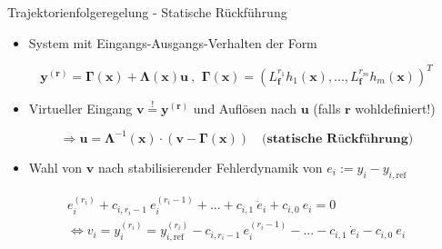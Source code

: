 \documentclass[
	ngerman,
	10pt,				%
	aspectratio=169, 	%
	xcolor=dvipsnames
]{beamer}
\begin{document}

\begin{frame}[t,fragile,label=trajektorienregelung_3]{\large Trajektorienfolgeregelung - Statische Rückführung}
	
	\begin{itemize}
		\item System mit Eingangs-Ausgangs-Verhalten der Form
	\end{itemize}
	\begin{equation*}
	\mathbf{y}^{(\mathbf{r})} = \boldsymbol{\Gamma}(\mathbf{x}) + \boldsymbol{\Lambda}(\mathbf{x}) \mathbf{u} \ \text{, } \ \boldsymbol{\Gamma}(\mathbf{x}) = (L_{\mathbf{f}}^{r_1} h_1(\mathbf{x}), ..., L_{\mathbf{f}}^{r_m} h_m(\mathbf{x}))^T
	\end{equation*}
	\pause
	\begin{itemize}
		\item Virtueller Eingang $\mathbf{v} \stackrel{!}{=} \mathbf{y}^{(\mathbf{r})}$ und Auflösen nach $\mathbf{u}$ (falls $\mathbf{r}$ wohldefiniert!)
	\end{itemize}
	\pause
	\begin{equation*}
	\Rightarrow \mathbf{u} = \boldsymbol{\Lambda }^{-1}(\mathbf{x}) \cdot (\mathbf{v} - \boldsymbol{\Gamma}(\mathbf{x})) \quad \textbf{(statische Rückführung)}
	\end{equation*}
	\begin{itemize}
		\item Wahl von $\mathbf{v}$ nach stabilisierender Fehlerdynamik von $e_i := y_i - y_{i, \text{ref}}$
	\end{itemize}
	\begin{align*}
	e_i^{(r_i)} + c_{i, r_i-1} \ e_i^{(r_i-1)} + ... + c_{i, 1} \ \dot{e}_i + c_{i, 0} \ e_i = 0 \\
	\Leftrightarrow v_i = y_i^{(r_i)} = y_{i, \text{ref}}^{(r_i)} - c_{i, r_i-1} \ e_i^{(r_i-1)} - ... - c_{i, 1} \ \dot{e}_i - c_{i, 0} \ e_i
	\end{align*}
	

\end{frame}
\end{document}

